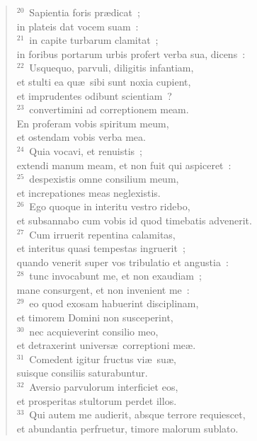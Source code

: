 \begin{flushleft}\begin{verse}${}^{20}$~Sapientia foris pr\ae dicat~;\\ in plateis dat vocem suam~:\\
${}^{21}$~in capite turbarum clamitat~;\\ in foribus portarum urbis profert verba sua, dicens~:\\
${}^{22}$~Usquequo, parvuli, diligitis infantiam,\\ et stulti ea qu\ae\ sibi sunt noxia cupient,\\ et imprudentes odibunt scientiam~?\\
${}^{23}$~convertimini ad correptionem meam.\\ En proferam vobis spiritum meum,\\ et ostendam vobis verba mea.\\
${}^{24}$~Quia vocavi, et renuistis~;\\ extendi manum meam, et non fuit qui aspiceret~:\\
${}^{25}$~despexistis omne consilium meum,\\ et increpationes meas neglexistis.\\
${}^{26}$~Ego quoque in interitu vestro ridebo,\\ et subsannabo cum vobis id quod timebatis advenerit.\\
${}^{27}$~Cum irruerit repentina calamitas,\\ et interitus quasi tempestas ingruerit~;\\ quando venerit super vos tribulatio et angustia~:\\
${}^{28}$~tunc invocabunt me, et non exaudiam~;\\ mane consurgent, et non invenient me~:\\
${}^{29}$~eo quod exosam habuerint disciplinam,\\ et timorem Domini non susceperint,\\
${}^{30}$~nec acquieverint consilio meo,\\ et detraxerint univers\ae\ correptioni me\ae .\\
${}^{31}$~Comedent igitur fructus vi\ae\ su\ae ,\\ suisque consiliis saturabuntur.\\
${}^{32}$~Aversio parvulorum interficiet eos,\\ et prosperitas stultorum perdet illos.\\
${}^{33}$~Qui autem me audierit, absque terrore requiescet,\\ et abundantia perfruetur, timore malorum sublato.\end{verse}\end{flushleft}


